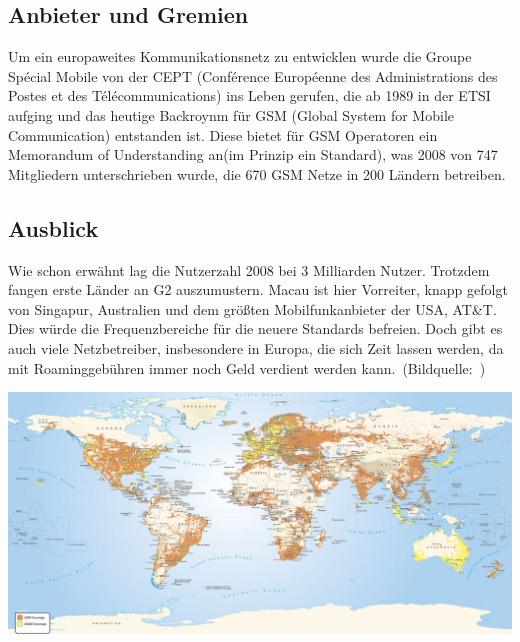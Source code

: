 \begin{multicols}{3}

\subsection*{Anbieter und Gremien}
Um ein europaweites Kommunikationsnetz zu entwicklen wurde die Groupe Spécial Mobile von der CEPT (Conférence Européenne des Administrations des Postes et des Télécommunications) ins Leben gerufen, die ab 1989 in der ETSI aufging und das heutige Backroynm für GSM (Global System for Mobile Communication) entstanden ist. Diese bietet für GSM Operatoren ein Memorandum of Understanding an(im Prinzip ein Standard), was 2008 von 747 Mitgliedern unterschrieben wurde, die 670 GSM Netze in 200 Ländern betreiben. \cite{G2.3}	

\subsection*{Ausblick}
Wie schon erwähnt lag die Nutzerzahl 2008 bei 3 Milliarden Nutzer. Trotzdem fangen erste Länder an G2 auszumustern. Macau ist hier Vorreiter, knapp gefolgt von Singapur, Australien und dem größten Mobilfunkanbieter der USA, AT\&T.
Dies würde die Frequenzbereiche für die neuere Standards befreien. Doch gibt es auch viele Netzbetreiber, insbesondere in Europa, die sich Zeit lassen werden, da mit Roaminggebühren immer noch Geld verdient werden kann.\cite{G2.3}~(Bildquelle:~\cite{G2.4})
\printbibliography[segment=7,heading=subbibliography]

\end{multicols}
\begin{Figure}
\includegraphics[width=\textwidth]{Kapitel/G2/Grafiken/GSM-Netzabdeckung-Weltweit.jpg}
\label{fig:G2.global}
\end{Figure}
\newpage
